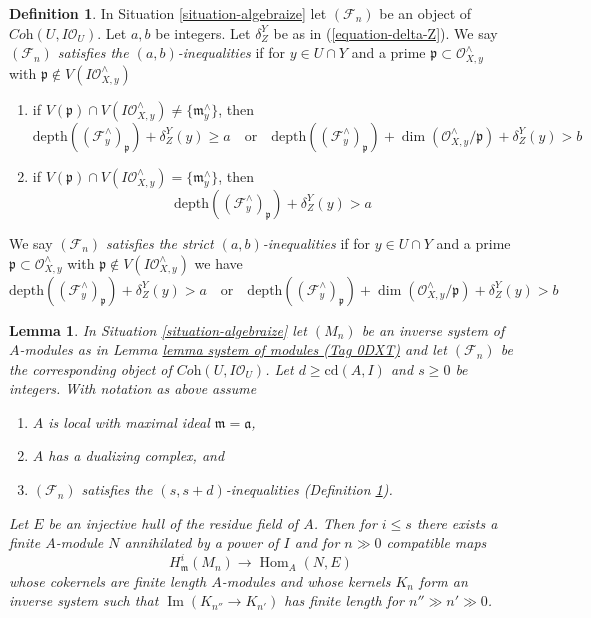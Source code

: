 \documentclass{amsart}
\theoremstyle{plain}
\newtheorem{lemma}[subsection]{Lemma}
\theoremstyle{definition}
\newtheorem{definition}[subsection]{Definition}
\theoremstyle{remark}
\numberwithin{equation}{subsection}
\def\Hom{\mathop{\mathrm{Hom}}\nolimits}
\def\Im{\mathop{\mathrm{Im}}}
\begin{document}
\begin{definition}
\label{definition-s-d-inequalities}
In Situation \ref{situation-algebraize} let $(\mathcal{F}_n)$ be an object
of $\textit{Coh}(U, I\mathcal{O}_U)$. Let $a, b$ be integers.
Let $\delta^Y_Z$ be as in (\ref{equation-delta-Z}).
We say
{\it $(\mathcal{F}_n)$ satisfies the $(a, b)$-inequalities} if for
$y \in U \cap Y$ and a prime $\mathfrak p \subset \mathcal{O}_{X, y}^\wedge$
with $\mathfrak p \not \in V(I\mathcal{O}_{X, y}^\wedge)$
\begin{enumerate}
\item if $V(\mathfrak p) \cap V(I\mathcal{O}_{X, y}^\wedge) \not =
\{\mathfrak m_y^\wedge\}$, then
$$
\text{depth}((\mathcal{F}^\wedge_y)_\mathfrak p) + \delta^Y_Z(y) \geq a
\quad\text{or}\quad
\text{depth}((\mathcal{F}^\wedge_y)_\mathfrak p) +
\dim(\mathcal{O}_{X, y}^\wedge/\mathfrak p) + \delta^Y_Z(y) > b
$$
\item if $V(\mathfrak p) \cap V(I\mathcal{O}_{X, y}^\wedge) =
\{\mathfrak m_y^\wedge\}$, then
$$
\text{depth}((\mathcal{F}^\wedge_y)_\mathfrak p) + \delta^Y_Z(y) > a
$$
\end{enumerate}
We say {\it $(\mathcal{F}_n)$ satisfies the strict $(a, b)$-inequalities}
if for $y \in U \cap Y$ and a prime
$\mathfrak p \subset \mathcal{O}_{X, y}^\wedge$ with
$\mathfrak p \not \in V(I\mathcal{O}_{X, y}^\wedge)$
we have
$$
\text{depth}((\mathcal{F}^\wedge_y)_\mathfrak p) + \delta^Y_Z(y) > a
\quad\text{or}\quad
\text{depth}((\mathcal{F}^\wedge_y)_\mathfrak p) +
\dim(\mathcal{O}_{X, y}^\wedge/\mathfrak p) + \delta^Y_Z(y) > b
$$
\end{definition}

\begin{lemma}
\label{lemma-helper-algebraize}
In Situation \ref{situation-algebraize} let $(M_n)$ be an inverse system of
$A$-modules as in Lemma \href{https://stacks.math.columbia.edu/tag/0DXT}{lemma system of modules (Tag 0DXT)} and let
$(\mathcal{F}_n)$ be the corresponding object of
$\textit{Coh}(U, I\mathcal{O}_U)$. Let $d \geq \text{cd}(A, I)$
and $s \geq 0$ be integers.
With notation as above assume
\begin{enumerate}
\item $A$ is local with maximal ideal $\mathfrak m = \mathfrak a$,
\item $A$ has a dualizing complex, and
\item $(\mathcal{F}_n)$ satisfies the $(s, s + d)$-inequalities
(Definition \ref{definition-s-d-inequalities}).
\end{enumerate}
Let $E$ be an injective hull of the residue field of $A$. Then for $i \leq s$
there exists a finite $A$-module $N$ annihilated by a power
of $I$ and for $n \gg 0$ compatible maps
$$
H^i_\mathfrak m(M_n) \to \Hom_A(N, E)
$$
whose cokernels are finite length $A$-modules and whose kernels $K_n$
form an inverse system such that $\Im(K_{n''} \to K_{n'})$ has finite
length for $n'' \gg n' \gg 0$.
\end{lemma}
\end{document}
